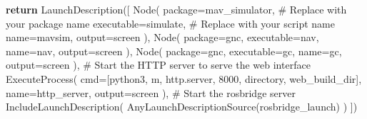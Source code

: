 \documentclass[
  letterpaper,
  DIV=11,
  numbers=noendperiod]{scrreprt}
\newenvironment{Shaded}{\begin{snugshade}}{\end{snugshade}}
\newcommand{\CommentTok}[1]{\textcolor[rgb]{0.37,0.37,0.37}{#1}}
\newcommand{\ControlFlowTok}[1]{\textcolor[rgb]{0.00,0.23,0.31}{\textbf{#1}}}
\newcommand{\NormalTok}[1]{\textcolor[rgb]{0.00,0.23,0.31}{#1}}
\newcommand{\OperatorTok}[1]{\textcolor[rgb]{0.37,0.37,0.37}{#1}}
\newcommand{\StringTok}[1]{\textcolor[rgb]{0.13,0.47,0.30}{#1}}
\begin{document}
\begin{Shaded}
\begin{Highlighting}[]
    \ControlFlowTok{return}\NormalTok{ LaunchDescription([}
\NormalTok{        Node(}
\NormalTok{            package}\OperatorTok{=}\StringTok{\textquotesingle{}mav\_simulator\textquotesingle{}}\NormalTok{,  }\CommentTok{\# Replace with your package name}
\NormalTok{            executable}\OperatorTok{=}\StringTok{\textquotesingle{}simulate\textquotesingle{}}\NormalTok{,  }\CommentTok{\# Replace with your script name}
\NormalTok{            name}\OperatorTok{=}\StringTok{\textquotesingle{}mavsim\textquotesingle{}}\NormalTok{,}
\NormalTok{            output}\OperatorTok{=}\StringTok{\textquotesingle{}screen\textquotesingle{}}
\NormalTok{        ),}
\NormalTok{        Node(}
\NormalTok{            package}\OperatorTok{=}\StringTok{\textquotesingle{}gnc\textquotesingle{}}\NormalTok{,}
\NormalTok{            executable}\OperatorTok{=}\StringTok{\textquotesingle{}nav\textquotesingle{}}\NormalTok{,}
\NormalTok{            name}\OperatorTok{=}\StringTok{\textquotesingle{}nav\textquotesingle{}}\NormalTok{,}
\NormalTok{            output}\OperatorTok{=}\StringTok{\textquotesingle{}screen\textquotesingle{}}
\NormalTok{        ),}
\NormalTok{        Node(}
\NormalTok{            package}\OperatorTok{=}\StringTok{\textquotesingle{}gnc\textquotesingle{}}\NormalTok{,}
\NormalTok{            executable}\OperatorTok{=}\StringTok{\textquotesingle{}gc\textquotesingle{}}\NormalTok{,}
\NormalTok{            name}\OperatorTok{=}\StringTok{\textquotesingle{}gc\textquotesingle{}}\NormalTok{,}
\NormalTok{            output}\OperatorTok{=}\StringTok{\textquotesingle{}screen\textquotesingle{}}
\NormalTok{        ),        }
        \CommentTok{\# Start the HTTP server to serve the web interface}
\NormalTok{        ExecuteProcess(}
\NormalTok{            cmd}\OperatorTok{=}\NormalTok{[}\StringTok{\textquotesingle{}python3\textquotesingle{}}\NormalTok{, }\StringTok{\textquotesingle{}{-}m\textquotesingle{}}\NormalTok{, }\StringTok{\textquotesingle{}http.server\textquotesingle{}}\NormalTok{, }\StringTok{\textquotesingle{}8000\textquotesingle{}}\NormalTok{, }\StringTok{\textquotesingle{}{-}{-}directory\textquotesingle{}}\NormalTok{, web\_build\_dir],}
\NormalTok{            name}\OperatorTok{=}\StringTok{\textquotesingle{}http\_server\textquotesingle{}}\NormalTok{,}
\NormalTok{            output}\OperatorTok{=}\StringTok{\textquotesingle{}screen\textquotesingle{}}
\NormalTok{        ),}
        \CommentTok{\# Start the rosbridge server}
\NormalTok{        IncludeLaunchDescription(}
\NormalTok{            AnyLaunchDescriptionSource(rosbridge\_launch)}
\NormalTok{        )}
\NormalTok{    ])}
\end{Highlighting}
\end{Shaded}
\end{document}
